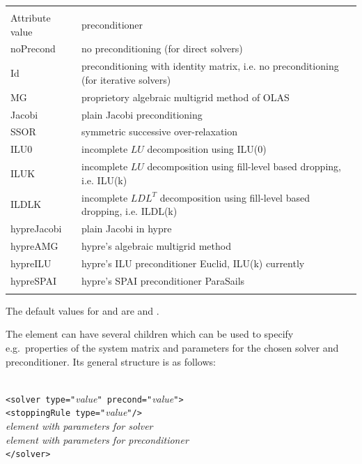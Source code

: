 \begin{center}
\begin{tabular}{lp{}}
\hline\noalign{\smallskip}
\multicolumn{2}{c}{Currently available choices for precond attribute of solver
element}\\
\noalign{\smallskip}\hline\noalign{\smallskip}
Attribute value & preconditioner\\
\noalign{\smallskip}\hline\noalign{\smallskip}
noPrecond   & no preconditioning (for direct solvers)\\
Id	    & preconditioning with identity matrix, i.e. no preconditioning
              (for iterative solvers)\\
MG	    & proprietory algebraic multigrid method of OLAS\\
Jacobi	    & plain Jacobi preconditioning\\
SSOR	    & symmetric successive over-relaxation\\
ILU0	    & incomplete $LU$ decomposition using ILU(0)\\
ILUK        & incomplete $LU$ decomposition using fill-level based dropping,
	      i.e. ILU(k)\\
ILDLK       & incomplete $LDL^T$ decomposition using fill-level based
              dropping, i.e. ILDL(k)\\
hypreJacobi & plain Jacobi in hypre\\
hypreAMG    & hypre's algebraic multigrid method\\
hypreILU    & hypre's ILU preconditioner Euclid, ILU(k) currently\\
hypreSPAI   & hypre's SPAI preconditioner ParaSails \\
\noalign{\smallskip}\hline
\end{tabular}
\end{center}
%
%
The default values for  and  are  and
.
%
%

The  element can have several children which can be used to specify
e.g.~properties of the system matrix and parameters for the chosen solver and
preconditioner. Its general structure is as follows:
%
%
\begin{center}
\begin{minipage}{0.6\textwidth}
\begin{tabbing}
\quad\=\\ \kill
\verb!<solver type="!\emph{value}\verb!" precond="!\emph{value}\verb!">!\\
\> \verb!<stoppingRule type="!\emph{value}\verb!"/>!\\
\> \emph{element with parameters for solver}\\
\> \emph{element with parameters for preconditioner}\\
\verb!</solver>!\\
\end{tabbing}
\end{minipage}
\end{center}
%
%
